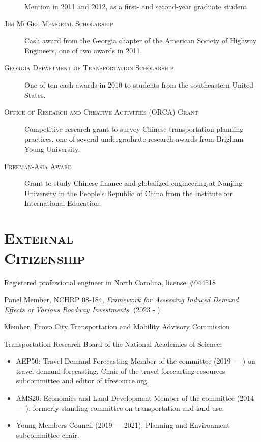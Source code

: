 \documentclass[margin,line]{res}
\newcommand{\secfont}{\scshape }
\newcommand{\acc}{\scshape }
\begin{document}
\begin{resume}
\begin{description}
Mention in 2011 and 2012, as a first- and second-year graduate student.
\item[\acc Jim McGee Memorial Scholarship] Cash award from the Georgia chapter of the
American Society of Highway Engineers, one of two awards in 2011.
\item[\acc Georgia Department of Transportation Scholarship] One of ten cash awards in
2010 to students from the southeastern United States.
\item[\acc Office of Research and Creative Activities (ORCA) Grant] Competitive
research grant to survey Chinese transportation planning practices, one of
several undergraduate research awards from Brigham Young University.
\item[\acc Freeman-Asia Award] Grant to study Chinese finance and globalized
engineering at Nanjing University in the People's Republic of China from the
Institute for International Education.
\end{description}

\noindent\makebox[\linewidth]{\rule{\linewidth}{0.4pt}}
\section{\secfont External \\ Citizenship}

Registered professional engineer in North Carolina, license \#044518

Panel Member, NCHRP 08-184, \textit{Framework for Assessing Induced Demand Effects of Various Roadway Investments}. (2023 - )

Member, Provo City Transportation and Mobility Advisory Commission

Transportation Research Board of the National Academies of Science:

\begin{itemize}
  \item AEP50: Travel Demand Forecasting Member of the committee (2019 --- ) on
  travel demand forecasting. Chair of the travel forecasting resources
  subcommittee and editor of \url{tfresource.org}.
  \item AMS20: Economics and Land Development Member of the committee (2014
  --- ). formerly standing committee on transportation and land use.
  \item Young Members Council (2019 --- 2021). Planning and Environment subcommittee
  chair.
\end{itemize}



\end{resume}
\end{document}
